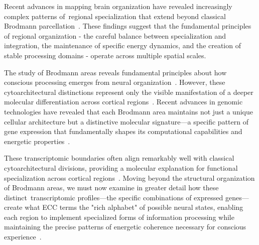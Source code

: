 Recent advances in mapping brain organization have revealed increasingly complex patterns of~regional specialization that extend beyond classical Brodmann parcellation~\cite{Hawrylycz2012, Tasic2018}. These findings suggest that the fundamental principles of regional organization - the careful balance between specialization and integration, the maintenance of specific energy dynamics, and the creation of stable processing domains - operate across multiple spatial scales.

The study of Brodmann areas reveals fundamental principles about how conscious processing emerges from neural organization~\cite{Eickhoff2018, breakspear2005dynamics}. However, these cytoarchitectural distinctions represent only the visible manifestation of a deeper molecular differentiation across cortical regions~\cite{Hawrylycz2012, Bakken2021}. Recent advances in genomic technologies have revealed that each Brodmann area maintains not just a unique cellular architecture but a distinctive molecular signature—a specific pattern of gene expression that fundamentally shapes its computational capabilities and energetic properties~\cite{Tasic2018, Lake2018}.

These transcriptomic boundaries often align remarkably well with classical cytoarchitectural divisions, providing a molecular explanation for functional specialization across cortical regions~\cite{Hawrylycz2012, Glasser2016}. Moving beyond the structural organization of Brodmann areas, we must now examine in greater detail how these distinct~transcriptomic profiles—the specific combinations of expressed genes—create what ECC terms the "rich alphabet" of possible neural states, enabling each region to implement specialized forms of information processing while maintaining the precise patterns of energetic coherence necessary for conscious experience~\cite{Zeng2017, Angulo2022}.
